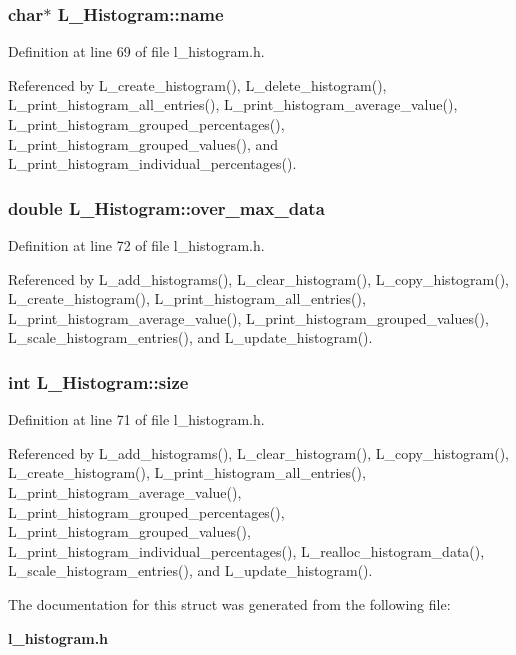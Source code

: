 \subsubsection{\setlength{\rightskip}{0pt plus 5cm}char$\ast$ \bf{L\_\-Histogram::name}}\label{structL__Histogram_22e6569c431df6ca272abb65d6c12567}




Definition at line 69 of file l\_\-histogram.h.

Referenced by L\_\-create\_\-histogram(), L\_\-delete\_\-histogram(), L\_\-print\_\-histogram\_\-all\_\-entries(), L\_\-print\_\-histogram\_\-average\_\-value(), L\_\-print\_\-histogram\_\-grouped\_\-percentages(), L\_\-print\_\-histogram\_\-grouped\_\-values(), and L\_\-print\_\-histogram\_\-individual\_\-percentages().
\subsubsection{\setlength{\rightskip}{0pt plus 5cm}double \bf{L\_\-Histogram::over\_\-max\_\-data}}\label{structL__Histogram_dc453e3fc3a879452c30aa86ef03204e}




Definition at line 72 of file l\_\-histogram.h.

Referenced by L\_\-add\_\-histograms(), L\_\-clear\_\-histogram(), L\_\-copy\_\-histogram(), L\_\-create\_\-histogram(), L\_\-print\_\-histogram\_\-all\_\-entries(), L\_\-print\_\-histogram\_\-average\_\-value(), L\_\-print\_\-histogram\_\-grouped\_\-values(), L\_\-scale\_\-histogram\_\-entries(), and L\_\-update\_\-histogram().
\subsubsection{\setlength{\rightskip}{0pt plus 5cm}int \bf{L\_\-Histogram::size}}\label{structL__Histogram_f93f7e48b44fad8032d3d839ad4f7e41}




Definition at line 71 of file l\_\-histogram.h.

Referenced by L\_\-add\_\-histograms(), L\_\-clear\_\-histogram(), L\_\-copy\_\-histogram(), L\_\-create\_\-histogram(), L\_\-print\_\-histogram\_\-all\_\-entries(), L\_\-print\_\-histogram\_\-average\_\-value(), L\_\-print\_\-histogram\_\-grouped\_\-percentages(), L\_\-print\_\-histogram\_\-grouped\_\-values(), L\_\-print\_\-histogram\_\-individual\_\-percentages(), L\_\-realloc\_\-histogram\_\-data(), L\_\-scale\_\-histogram\_\-entries(), and L\_\-update\_\-histogram().

The documentation for this struct was generated from the following file:\begin{CompactItemize}
\item 
\bf{l\_\-histogram.h}\end{CompactItemize}
